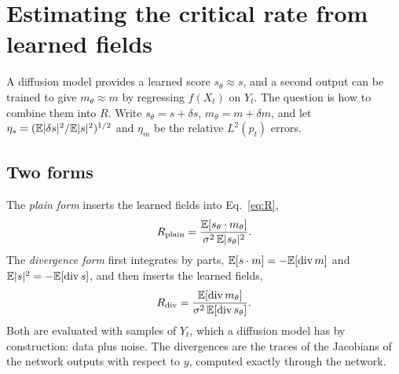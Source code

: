 \section{Estimating the critical rate from learned fields}
\label{sec:estimators}

A diffusion model provides a learned score $s_\theta \approx s$, and a second output can be trained to give $m_\theta \approx m$ by regressing $f(X_t)$ on $Y_t$. The question is how to combine them into $R$. Write $s_\theta = s + \delta s$, $m_\theta = m + \delta m$, and let $\eta_s = (\mathbb{E}|\delta s|^2/\mathbb{E}|s|^2)^{1/2}$ and $\eta_m$ be the relative $L^2(p_t)$ errors.

\subsection{Two forms}

The \emph{plain form} inserts the learned fields into Eq.~\eqref{eq:R},
\begin{equation}
R_{\rm plain} = \frac{\mathbb{E}[s_\theta\cdot m_\theta]}{\sigma^2\,\mathbb{E}|s_\theta|^2}.
\label{eq:Rplain}
\end{equation}
The \emph{divergence form} first integrates by parts, $\mathbb{E}[s\cdot m] = -\mathbb{E}[\operatorname{div} m]$ and $\mathbb{E}|s|^2 = -\mathbb{E}[\operatorname{div} s]$, and then inserts the learned fields,
\begin{equation}
R_{\rm div} = \frac{\mathbb{E}[\operatorname{div} m_\theta]}{\sigma^2\,\mathbb{E}[\operatorname{div} s_\theta]} .
\label{eq:Rdiv}
\end{equation}
Both are evaluated with samples of $Y_t$, which a diffusion model has by construction: data plus noise. The divergences are the traces of the Jacobians of the network outputs with respect to $y$, computed exactly through the network.

